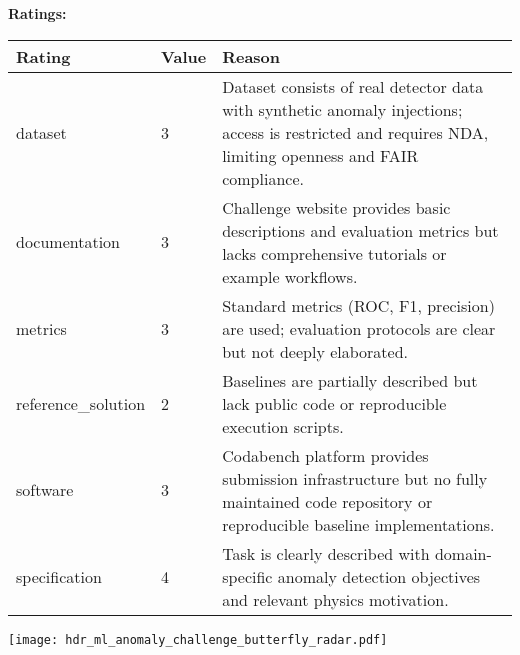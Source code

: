 {{{\bf Ratings:} ~ \\

\begin{tabular}{p{} p{} p{}}
\hline
Rating & Value & Reason \\
\hline
dataset & 3 & Dataset consists of real detector data with synthetic anomaly injections; access
is restricted and requires NDA, limiting openness and FAIR compliance.
 \\
documentation & 3 & Challenge website provides basic descriptions and evaluation metrics but lacks
comprehensive tutorials or example workflows.
 \\
metrics & 3 & Standard metrics (ROC, F1, precision) are used; evaluation protocols are clear
but not deeply elaborated.
 \\
reference\_solution & 2 & Baselines are partially described but lack public code or reproducible execution
scripts.
 \\
software & 3 & Codabench platform provides submission infrastructure but no fully maintained
code repository or reproducible baseline implementations.
 \\
specification & 4 & Task is clearly described with domain-specific anomaly detection objectives and
relevant physics motivation.
 \\
\hline
\end{tabular}

\texttt{[image: hdr\_ml\_anomaly\_challenge\_butterfly\_radar.pdf]}
}}
\clearpage